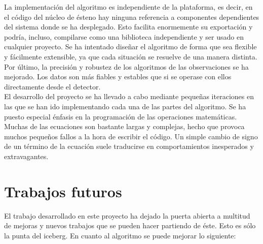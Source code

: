 La implementación del algoritmo es independiente de la plataforma, es decir, en el código del núcleo de ésteno hay ninguna referencia a componentes dependientes del sistema donde se ha desplegado. Esto facilita enormemente su exportación y podría, incluso, compilarse como una biblioteca independiente y ser usado en cualquier proyecto. Se ha intentado diseñar el algoritmo de forma que sea flexible y fácilmente extensible, ya que cada situación se resuelve de una manera distinta. Por último, la precisión y robustez de los algoritmos de las observaciones se ha mejorado. Los datos son más fiables y estables que si se operase con ellos directamente desde el detector. \\

El desarrollo del proyecto se ha llevado a cabo mediante pequeñas iteraciones en las que se han ido implementando cada una de las partes del algoritmo. Se ha puesto especial énfasis en la programación de las operaciones matemáticas. Muchas de las ecuaciones son bastante largas y complejas, hecho que provoca muchos pequeños fallos a la hora de escribir el código. Un simple cambio de signo de un término de la ecuación suele traducirse en comportamientos inesperados y extravagantes.

\section{Trabajos futuros}
\label{sec:trabajosfuturos}

El trabajo desarrollado en este proyecto ha dejado la puerta abierta a multitud de mejoras y nuevos trabajos que se pueden hacer partiendo de éste. Esto es sólo la punta del iceberg. En cuanto al algoritmo se puede mejorar lo siguiente:


